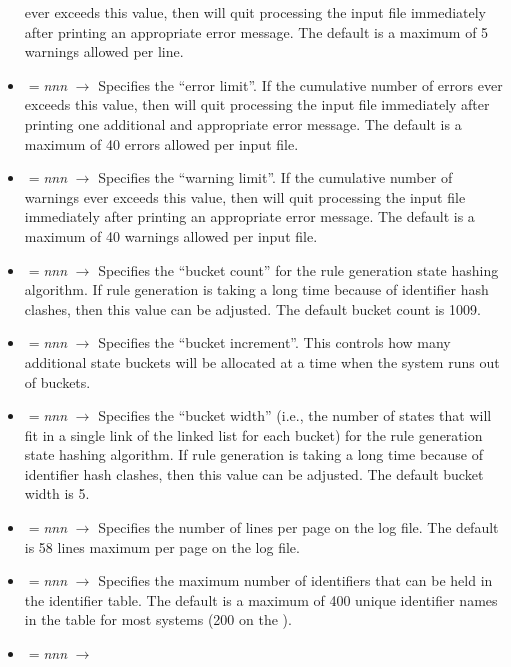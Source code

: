 \begin{footnotesize}
\begin{itemize}
      ever exceeds this value, then  will quit processing
       the input file
      immediately after printing an appropriate error message.
      The default is a maximum of 5 warnings allowed per line.
\item {}$=${\em nnn} $\longrightarrow$
      Specifies the ``error limit''.   If the cumulative number of errors
      ever exceeds this value, then  will quit processing
      the input file
      immediately after printing one additional and appropriate error message.
      The default is a maximum of 40 errors allowed per input file.
\item {}$=${\em nnn} $\longrightarrow$
      Specifies the ``warning limit''.   If the cumulative number of warnings
      ever exceeds this value, then  will quit processing
      the input file
      immediately after printing an appropriate error message.
      The default is a maximum of 40 warnings allowed per input file.
\item {}$=${\em nnn} $\longrightarrow$
      Specifies the ``bucket count'' for the rule generation state hashing
      algorithm.   If rule generation is taking a long time
      because of identifier hash clashes, then this value can be adjusted.
      The default bucket count is 1009.
\item {}$=${\em nnn} $\longrightarrow$
      Specifies the ``bucket increment''.   This controls how many additional
      state buckets will be allocated at a time when the system runs out
      of buckets.
\item {}$=${\em nnn} $\longrightarrow$
      Specifies the ``bucket width'' (i.e., the number of states that will
      fit in a single link of the linked list for each bucket) 
      for the rule generation state hashing
      algorithm.   If rule generation is taking a long time
      because of identifier hash clashes, then this value can be adjusted.
      The default bucket width is 5.
\item {}$=${\em nnn} $\longrightarrow$
      Specifies the number of lines per page on the log file.
      The default is 58 lines maximum per page on the log file.
\item {}$=${\em nnn} $\longrightarrow$
      Specifies the maximum number of identifiers
      that can be held in the 
      identifier table.
      The default is a maximum of 400 unique identifier names in the table
      for most systems (200 on the ).
\item {}$=${\em nnn} $\longrightarrow$

\end{itemize}
\end{footnotesize}

